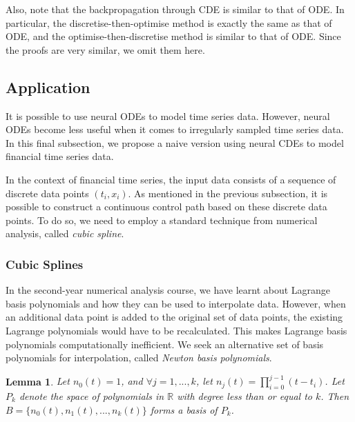 \documentclass[a4paper,11pt,titlepage]{article}
\theoremstyle{definition}
\theoremstyle{plain}
\newtheorem{lemma}[theorem]{Lemma}
\theoremstyle{remark}
\begin{document}
Also, note that the backpropagation through CDE is similar to that of ODE. In particular, the discretise-then-optimise method is exactly the same as that of ODE, and the optimise-then-discretise method is similar to that of ODE. Since the proofs are very similar, we omit them here.

\subsection{Application}

It is possible to use neural ODEs to model time series data. However, neural ODEs become less useful when it comes to irregularly sampled time series data. In this final subsection, we propose a naive version using neural CDEs to model financial time series data.

In the context of financial time series, the input data consists of a sequence of discrete data points $\left(t_i,x_i\right)$. As mentioned in the previous subsection, it is possible to construct a continuous control path based on these discrete data points. To do so, we need to employ a standard technique from numerical analysis, called \textit{cubic spline}. 

\subsubsection{Cubic Splines}

In the second-year numerical analysis course, we have learnt about Lagrange basis polynomials and how they can be used to interpolate data. However, when an additional data point is added to the original set of data points, the existing Lagrange polynomials would have to be recalculated. This makes Lagrange basis polynomials computationally inefficient. We seek an alternative set of basis polynomials for interpolation, called \textit{Newton basis polynomials}.

\begin{lemma}
    Let $n_0(t)=1$, and $\forall j=1,...,k$, let $n_j(t)=\prod_{i=0}^{j-1}(t-t_i)$. Let $P_k$ denote the space of polynomials in $\mathbb{R}$ with  degree less than or equal to $k$. Then $B=\{n_0(t),n_1(t),...,n_k(t)\}$ forms a basis of $P_k$.
\end{lemma}
\end{document}
